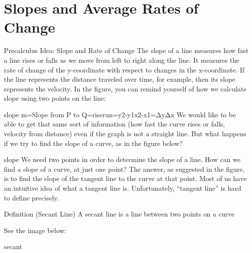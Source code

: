 \section{Slopes and Average Rates of Change}
\label{sec:slope}

Precalculus Idea: Slope and Rate of Change
The slope of a line measures how fast a line rises or falls as we move from left to right along the line. It measures the rate of change of the y-coordinate with respect to changes in the x-coordinate. If the line represents the distance traveled over time, for example, then its slope represents the velocity. In the figure, you can remind yourself of how we calculate slope using two points on the line:

slope
m=Slope from P to Q=riserun=y2-y1x2-x1=ΔyΔx
We would like to be able to get that same sort of information (how fast the curve rises or falls, velocity from distance) even if the graph is not a straight line. But what happens if we try to find the slope of a curve, as in the figure below?

slope
We need two points in order to determine the slope of a line. How can we find a slope of a curve, at just one point? The answer, as suggested in the figure, is to find the slope of the tangent line to the curve at that point. Most of us have an intuitive idea of what a tangent line is. Unfortunately, “tangent line” is hard to define precisely.

Definition (Secant Line)
A secant line is a line between two points on a curve

See the image below:

secant
